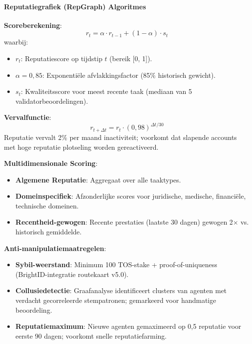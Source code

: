\documentclass[11pt]{article}
\begin{document}
\paragraph{Reputatiegrafiek (RepGraph) Algoritmes}

\textbf{Scoreberekening}:
\begin{equation}
r_t = \alpha \cdot r_{t-1} + (1 - \alpha) \cdot s_t
\end{equation}
waarbij:
\begin{itemize}[noitemsep]
  \item $r_t$: Reputatiescore op tijdstip $t$ (bereik [0, 1]).
  \item $\alpha = 0,85$: Exponentiële afvlakkingsfactor (85\% historisch gewicht).
  \item $s_t$: Kwaliteitsscore voor meest recente taak (mediaan van 5 validatorbeoordelingen).
\end{itemize}

\textbf{Vervalfunctie}:
\begin{equation}
r_{t+\Delta t} = r_t \cdot (0,98)^{\Delta t / 30}
\end{equation}
Reputatie vervalt 2\% per maand inactiviteit; voorkomt dat slapende accounts met hoge reputatie plotseling worden gereactiveerd.

\textbf{Multidimensionale Scoring}:
\begin{itemize}[noitemsep]
  \item \textbf{Algemene Reputatie}: Aggregaat over alle taaktypes.
  \item \textbf{Domeinspecifiek}: Afzonderlijke scores voor juridische, medische, financiële, technische domeinen.
  \item \textbf{Recentheid-gewogen}: Recente prestaties (laatste 30 dagen) gewogen 2$\times$ vs. historisch gemiddelde.
\end{itemize}

\textbf{Anti-manipulatiemaatregelen}:
\begin{itemize}[noitemsep]
  \item \textbf{Sybil-weerstand}: Minimum 100 TOS-stake + proof-of-uniqueness (BrightID-integratie routekaart v5.0).
  \item \textbf{Collusiedetectie}: Graafanalyse identificeert clusters van agenten met verdacht gecorreleerde stempatronen; gemarkeerd voor handmatige beoordeling.
  \item \textbf{Reputatiemaximum}: Nieuwe agenten gemaximeerd op 0,5 reputatie voor eerste 90 dagen; voorkomt snelle reputatiefarming.
\end{itemize}
\end{document}
